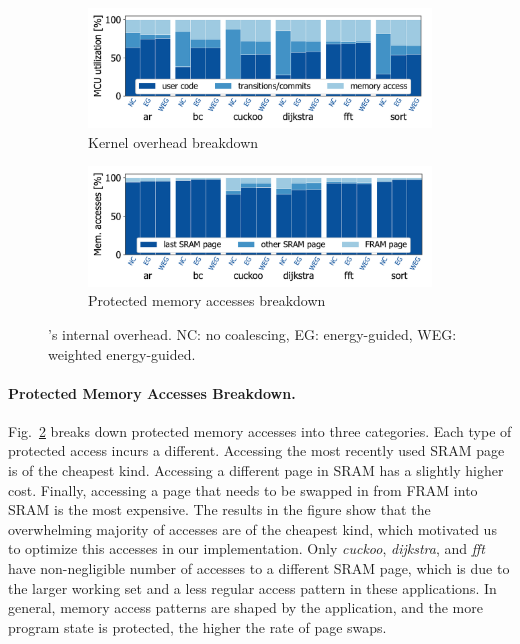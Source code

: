 \begin{figure}
    \begin{subfigure}{\columnwidth}
			\centering
        \includegraphics[width=.8\columnwidth]{figures/overallOverhead.pdf}
        \caption{Kernel overhead breakdown}
        \label{fig:kernel-overhead}
    \end{subfigure}
    \begin{subfigure}{\columnwidth}
			\centering
        \includegraphics[width=.8\columnwidth]{figures/memAccess.pdf}
        \caption{Protected memory accesses breakdown}
        \label{fig:mem-accesses}
    \end{subfigure}
    \caption{\sys's internal overhead. NC: no coalescing, EG:
    energy-guided, WEG: weighted energy-guided.}
    \label{fig:war}
\end{figure}

\paragraph{Protected Memory Accesses Breakdown.}
%
Fig.~\ref{fig:mem-accesses} breaks down protected memory accesses
into three categories.
%
Each type of protected access incurs a different.
Accessing the most recently used SRAM page is of the cheapest kind.
Accessing a different page in SRAM has a slightly higher cost.
Finally, accessing a page that needs to be swapped in
from FRAM into SRAM is the most expensive.
%
The results in the figure show that the overwhelming majority of accesses are
of the cheapest kind, which motivated us to optimize this accesses in our
implementation.
%
Only \textit{cuckoo}, \textit{dijkstra}, and \textit{fft} have non-negligible
number of accesses to a different SRAM page, which is due to the larger working
set and a less regular access pattern in these applications.
%
In general, memory access patterns are shaped by the application, and the more
program state is protected, the higher the rate of page swaps.
%

